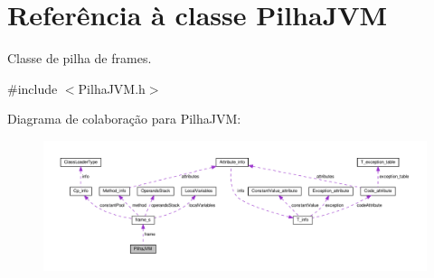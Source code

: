 \hypertarget{classPilhaJVM}{}\section{Referência à classe Pilha\+J\+VM}
\label{classPilhaJVM}


Classe de pilha de frames.  




{\ttfamily \#include $<$Pilha\+J\+V\+M.\+h$>$}



Diagrama de colaboração para Pilha\+J\+VM\+:\nopagebreak
\begin{figure}[H]
\begin{center}
\leavevmode
\includegraphics[width=350pt]{classPilhaJVM__coll__graph}
\end{center}
\end{figure}
